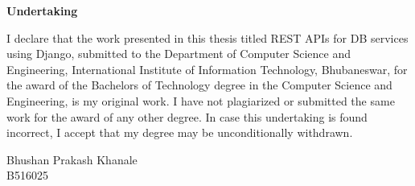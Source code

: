 \centerline{\Large{\bf Undertaking}}
\vspace{1cm}

I declare that the work presented in this thesis titled
REST APIs for DB services using Django, submitted to the Department of
Computer Science and Engineering, International Institute of Information
Technology, Bhubaneswar, for the award of the Bachelors of Technology degree
in the Computer Science and Engineering, is my original work. I have not
plagiarized or submitted the same work for the award of any other degree.
In case this undertaking is found incorrect, I accept that my degree may be
unconditionally withdrawn.

\vspace*{0.5in}
\begin{flushright}
Bhushan Prakash Khanale\\
B516025
\end{flushright}

